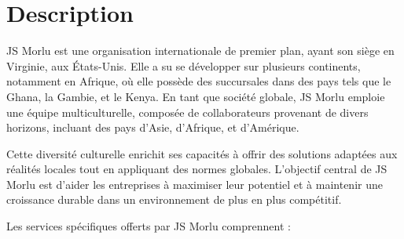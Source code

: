 \section{Description}

JS Morlu est une organisation internationale de premier plan, ayant son siège en Virginie, aux États-Unis. Elle a su se développer sur plusieurs continents, notamment en Afrique, où elle possède des succursales dans des pays tels que le Ghana, la Gambie, et le Kenya. En tant que société globale, JS Morlu emploie une équipe multiculturelle, composée de collaborateurs provenant de divers horizons, incluant des pays d'Asie, d'Afrique, et d'Amérique. 

\vspace{0.5cm}

Cette diversité culturelle enrichit ses capacités à offrir des solutions adaptées aux réalités locales tout en appliquant des normes globales. L'objectif central de JS Morlu est d'aider les entreprises à maximiser leur potentiel et à maintenir une croissance durable dans un environnement de plus en plus compétitif.

\vspace{0.5cm}

Les services spécifiques offerts par JS Morlu comprennent :

\vspace{0.3cm}

